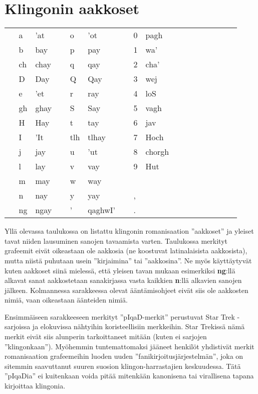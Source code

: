 \documentclass{book}
\begin{document}
\appendix
\chapter{Klingonin aakkoset}

\begin{tabular}{Tl Bl Il | Tl Bl Il | Tl l Il}
     & a & 'at &  & o & 'ot &  & 0 & pagh \\
     & b & bay &  & p & pay &  & 1 & wa' \\
     & ch & chay &  & q & qay &  & 2 & cha' \\
     & D & Day &  & Q & Qay &  & 3 & wej \\
     & e & 'et &  & r & ray &  & 4 & loS \\
     & gh & ghay &  & S & Say &  & 5 & vagh \\
     & H & Hay &  & t & tay &  & 6 & jav \\
     & I & 'It &  & tlh & tlhay &  & 7 & Hoch \\
     & j & jay &  & u & 'ut &  & 8 & chorgh\\
     & l & lay &  & v & vay &  & 9 & Hut\\
     & m & may &  & w & way & & & \\
     & n & nay &  & y & yay &  & , & \\
     & ng & ngay &  & ' & qaghwI' &  & . & \\
\end{tabular}

Yllä olevassa taulukossa on listattu klingonin romanisaation ''aakkoset'' ja yleiset tavat niiden lausuminen sanojen tavaamista varten.
Taulukossa merkityt grafeemit eivät oikeastaan ole aakkosia (ne koostuvat latinalaisista aakkosista), mutta niistä puhutaan usein ''kirjaimina'' tai ''aakkosina''.
Ne myös käyttäytyvät kuten aakkoset siinä mielessä,
että yleisen tavan mukaan esimerkiksi \textbf{ng}:llä alkavat sanat aakkostetaan sanakirjassa vasta kaikkien \textbf{n}:llä alkavien sanojen jälkeen.
Kolmannessa sarakkeessa olevat ääntämisohjeet eivät siis ole aakkosten nimiä, vaan oikeastaan äänteiden nimiä.

Ensimmäiseen sarakkeeseen merkityt ''pIqaD-merkit'' perustuvat Star Trek -sarjoissa ja elokuvissa nähtyihin koristeellisiin merkkeihin.
Star Trekissä nämä merkit eivät siis alunperin tarkoittaneet mitään (kuten ei sarjojen ''klin\-gon\-kaan'').
Myöhemmin tuntemattomaksi jääneet henkilöt yhdistivät merkit romanisaation grafeemeihin luoden uuden ''fanikirjoitusjärjestelmän'',
joka on sitemmin saavuttanut suuren suosion klingon-harrastajien keskuudessa.
Tätä ''pIqaDia'' ei kuitenkaan voida pitää mitenkään kanonisena tai virallisena tapana kirjoittaa klingonia.
\end{document}
